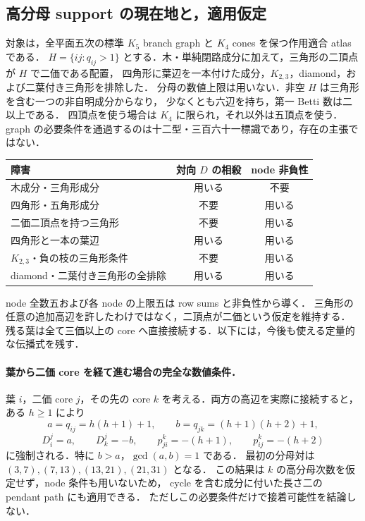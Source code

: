 \subsection{高分母 support の現在地と，適用仮定}
\label{ns16:current-support}

対象は，全平面五次の標準 $K_5$ branch graph と $K_4$ cones を保つ作用適合 atlas である．
$H=\{ij:q_{ij}>1\}$ とする．木・単純閉路成分に加えて，三角形の二頂点が $H$ で二価である配置，
四角形に葉辺を一本付けた成分，$K_{2,3}$，diamond，および二葉付き三角形を排除した．
分母の数値上限は用いない．非空 $H$ は三角形を含む一つの非自明成分からなり，
少なくとも六辺を持ち，第一 Betti 数は二以上である．
四頂点を使う場合は $K_4$ に限られ，それ以外は五頂点を使う．
graph の必要条件を通過するのは十二型・三百六十一標識であり，存在の主張ではない．

\begin{center}
\begin{tabular}{lcc}
障害 & 対向 $D$ の相殺 & node 非負性\\\hline
木成分・三角形成分 & 用いる & 不要\\
四角形・五角形成分 & 不要 & 用いる\\
二価二頂点を持つ三角形 & 不要 & 用いる\\
四角形と一本の葉辺 & 用いる & 用いる\\
$K_{2,3}$・負の枝の三角形条件 & 不要 & 用いる\\
diamond・二葉付き三角形の全排除 & 用いる & 用いる
\end{tabular}
\end{center}
node 全数五および各 node の上限五は row sums と非負性から導く．
三角形の任意の追加高辺を許したわけではなく，二頂点が二価という仮定を維持する．
残る葉は全て三価以上の core へ直接接続する．以下には，今後も使える定量的な伝播式を残す．

\paragraph{葉から二価 core を経て進む場合の完全な数値条件．}
葉 $i$，二価 core $j$，その先の core $k$ を考える．両方の高辺を実際に接続すると，
ある $h\geq1$ により
\[
 a=q_{ij}=h(h+1)+1,\qquad b=q_{jk}=(h+1)(h+2)+1,
\]
\[
 D^j_i=a,\qquad D^j_k=-b,\qquad
 p^k_{ji}=-(h+1),\qquad p^k_{ij}=-(h+2)
\]
に強制される．特に $b>a$，$\gcd(a,b)=1$ である．
最初の分母対は $(3,7),(7,13),(13,21),(21,31)$ となる．
この結果は $k$ の高分母次数を仮定せず，node 条件も用いないため，
cycle を含む成分に付いた長さ二の pendant path にも適用できる．
ただしこの必要条件だけで接着可能性を結論しない．

